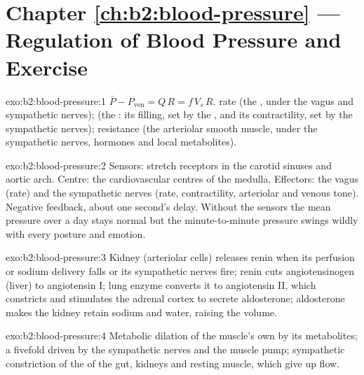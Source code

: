 \section*{Chapter \ref{ch:b2:blood-pressure} --- Regulation of Blood Pressure and Exercise}

\begin{solution}{exo:b2:blood-pressure:1}
$\bar P - P_{\text{ven}} = Q\,R = f\,V_s\,R$.  rate (the
, under the vagus and sympathetic nerves);  (the : its filling, set by the , and its
contractility, set by the sympathetic nerves); resistance (the
arteriolar smooth muscle, under the sympathetic nerves, hormones and
local metabolites).
\end{solution}

\begin{solution}{exo:b2:blood-pressure:2}
Sensors: stretch receptors in the carotid sinuses and aortic arch.
Centre: the cardiovascular centres of the medulla. Effectors: the
vagus (rate) and the sympathetic nerves (rate, contractility,
arteriolar and venous tone). Negative feedback, about one second's
delay. Without the sensors the mean pressure over a day stays
normal but the minute-to-minute pressure swings wildly with every
posture and emotion.
\end{solution}

\begin{solution}{exo:b2:blood-pressure:3}
Kidney (arteriolar cells) releases renin when its perfusion or
sodium delivery falls or its sympathetic nerves fire; renin cuts
angiotensinogen (liver) to angiotensin I; lung enzyme converts it to
angiotensin II, which constricts  and stimulates the
adrenal cortex to secrete aldosterone; aldosterone makes the kidney
retain sodium and water, raising the  volume.
\end{solution}

\begin{solution}{exo:b2:blood-pressure:4}
Metabolic dilation of the muscle's own  by its
metabolites; a fivefold  driven by the sympathetic
nerves and the muscle pump; sympathetic constriction of the
 of the gut, kidneys and resting muscle, which give up
flow.
\end{solution}

